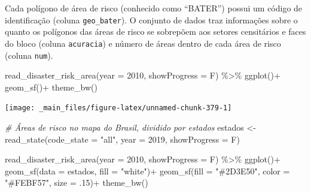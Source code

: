 \documentclass[
  brazilian,
]{book}
\newenvironment{Shaded}{\begin{snugshade}}{\end{snugshade}}
\newcommand{\AttributeTok}[1]{\textcolor[rgb]{0.77,0.63,0.00}{#1}}
\newcommand{\CommentTok}[1]{\textcolor[rgb]{0.56,0.35,0.01}{\textit{#1}}}
\newcommand{\DecValTok}[1]{\textcolor[rgb]{0.00,0.00,0.81}{#1}}
\newcommand{\FunctionTok}[1]{\textcolor[rgb]{0.00,0.00,0.00}{#1}}
\newcommand{\NormalTok}[1]{#1}
\newcommand{\OtherTok}[1]{\textcolor[rgb]{0.56,0.35,0.01}{#1}}
\newcommand{\SpecialCharTok}[1]{\textcolor[rgb]{0.00,0.00,0.00}{#1}}
\newcommand{\StringTok}[1]{\textcolor[rgb]{0.31,0.60,0.02}{#1}}
\begin{document}
Cada polígono de área de risco (conhecido como ``BATER'') possui um código de identificação (coluna \texttt{geo\_bater}). O conjunto de dados traz informações sobre o quanto os polígonos das áreas de risco se sobrepõem aos setores censitários e faces do bloco (coluna \texttt{acuracia}) e número de áreas dentro de cada área de risco (coluna \texttt{num}).

\begin{Shaded}
\begin{Highlighting}[]
\FunctionTok{read\_disaster\_risk\_area}\NormalTok{(}\AttributeTok{year =} \DecValTok{2010}\NormalTok{,}
                        \AttributeTok{showProgress =}\NormalTok{ F) }\SpecialCharTok{\%\textgreater{}\%}
  \FunctionTok{ggplot}\NormalTok{()}\SpecialCharTok{+}
  \FunctionTok{geom\_sf}\NormalTok{()}\SpecialCharTok{+}
  \FunctionTok{theme\_bw}\NormalTok{()}
\end{Highlighting}
\end{Shaded}

\begin{center}\texttt{[image: \_main\_files/figure-latex/unnamed-chunk-379-1]} \end{center}

\begin{Shaded}
\begin{Highlighting}[]
\CommentTok{\# Áreas de risco no mapa do Brasil, dividido por estados}
\NormalTok{estados }\OtherTok{\textless{}{-}} \FunctionTok{read\_state}\NormalTok{(}\AttributeTok{code\_state =} \StringTok{"all"}\NormalTok{,}
                      \AttributeTok{year =} \DecValTok{2019}\NormalTok{,}
                      \AttributeTok{showProgress =}\NormalTok{ F)}

\FunctionTok{read\_disaster\_risk\_area}\NormalTok{(}\AttributeTok{year =} \DecValTok{2010}\NormalTok{,}
                        \AttributeTok{showProgress =}\NormalTok{ F) }\SpecialCharTok{\%\textgreater{}\%}
  \FunctionTok{ggplot}\NormalTok{()}\SpecialCharTok{+}
  \FunctionTok{geom\_sf}\NormalTok{(}\AttributeTok{data =}\NormalTok{ estados, }\AttributeTok{fill =} \StringTok{"white"}\NormalTok{)}\SpecialCharTok{+}
  \FunctionTok{geom\_sf}\NormalTok{(}\AttributeTok{fill =} \StringTok{"\#2D3E50"}\NormalTok{, }\AttributeTok{color =} \StringTok{"\#FEBF57"}\NormalTok{, }\AttributeTok{size =}\NormalTok{ .}\DecValTok{15}\NormalTok{)}\SpecialCharTok{+}
  \FunctionTok{theme\_bw}\NormalTok{()}
\end{Highlighting}
\end{Shaded}
\end{document}
